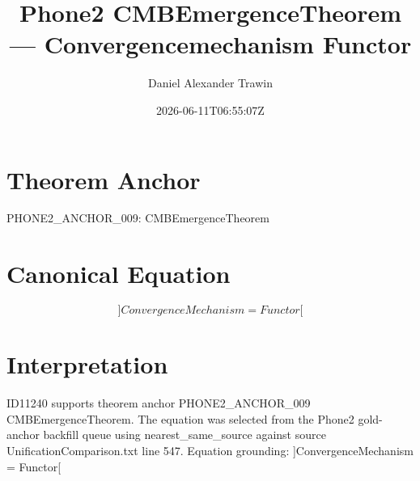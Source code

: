 \documentclass[11pt]{article}
\title{Phone2 CMBEmergenceTheorem — Convergencemechanism Functor}
\author{Daniel Alexander Trawin}
\date{2026-06-11T06:55:07Z}
\begin{document}
\maketitle
\section*{Theorem Anchor}
PHONE2_ANCHOR_009: CMBEmergenceTheorem
\section*{Canonical Equation}
\[
]ConvergenceMechanism = Functor[
\]
\section*{Interpretation}
ID11240 supports theorem anchor PHONE2_ANCHOR_009 CMBEmergenceTheorem. The equation was selected from the Phone2 gold-anchor backfill queue using nearest_same_source against source UnificationComparison.txt line 547. Equation grounding: ]ConvergenceMechanism = Functor[
\end{document}
